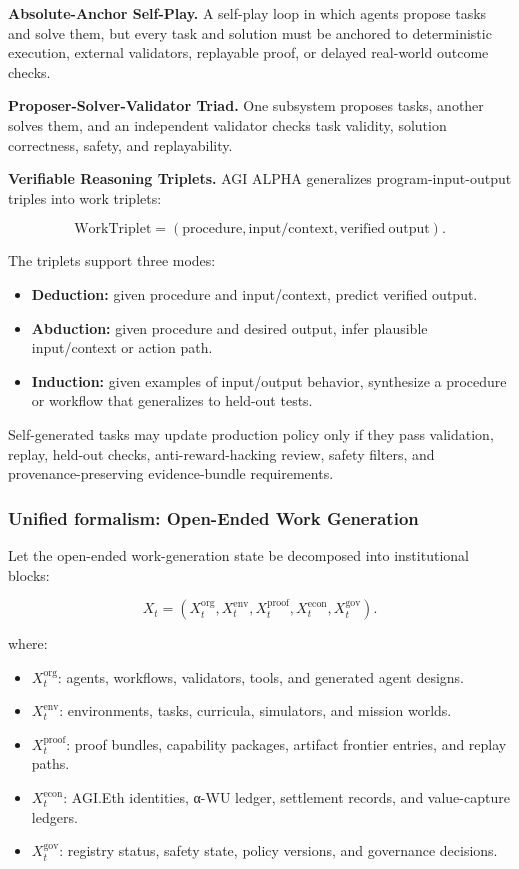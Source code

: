 \documentclass[
  11pt,
]{article}
\providecommand{\tightlist}{%
  \setlength{\itemsep}{0pt}\setlength{\parskip}{0pt}}
\begin{document}
\textbf{Absolute-Anchor Self-Play.} A self-play loop in which agents
propose tasks and solve them, but every task and solution must be
anchored to deterministic execution, external validators, replayable
proof, or delayed real-world outcome checks.

\textbf{Proposer-Solver-Validator Triad.} One subsystem proposes tasks,
another solves them, and an independent validator checks task validity,
solution correctness, safety, and replayability.

\textbf{Verifiable Reasoning Triplets.} AGI ALPHA generalizes
program-input-output triples into work triplets:

\[
\mathrm{WorkTriplet}=(\mathrm{procedure},\mathrm{input/context},\mathrm{verified\ output}).
\]

The triplets support three modes:

\begin{itemize}
\tightlist
\item
  \textbf{Deduction:} given procedure and input/context, predict
  verified output.
\item
  \textbf{Abduction:} given procedure and desired output, infer
  plausible input/context or action path.
\item
  \textbf{Induction:} given examples of input/output behavior,
  synthesize a procedure or workflow that generalizes to held-out tests.
\end{itemize}

Self-generated tasks may update production policy only if they pass
validation, replay, held-out checks, anti-reward-hacking review, safety
filters, and provenance-preserving evidence-bundle requirements.

\subsubsection{Unified formalism: Open-Ended Work
Generation}\label{unified-formalism-open-ended-work-generation}

Let the open-ended work-generation state be decomposed into
institutional blocks:

\[
X_t=\left(X_t^{\mathrm{org}},X_t^{\mathrm{env}},X_t^{\mathrm{proof}},X_t^{\mathrm{econ}},X_t^{\mathrm{gov}}\right).
\]

where:

\begin{itemize}
\tightlist
\item
  \(X_t^{\mathrm{org}}\): agents, workflows, validators, tools, and
  generated agent designs.
\item
  \(X_t^{\mathrm{env}}\): environments, tasks, curricula, simulators,
  and mission worlds.
\item
  \(X_t^{\mathrm{proof}}\): proof bundles, capability packages, artifact
  frontier entries, and replay paths.
\item
  \(X_t^{\mathrm{econ}}\): AGI.Eth identities, α-WU ledger, settlement
  records, and value-capture ledgers.
\item
  \(X_t^{\mathrm{gov}}\): registry status, safety state, policy
  versions, and governance decisions.
\end{itemize}
\end{document}
